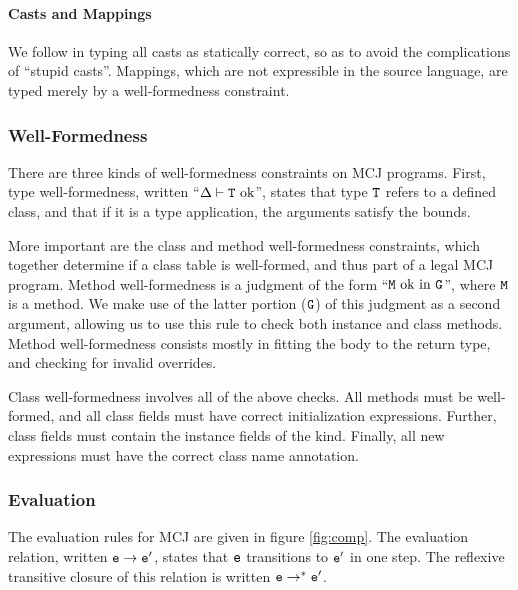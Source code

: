 \documentclass{acmconfbig}
\begin{document}
\paragraph{Casts and Mappings}
We follow \cite{MixGen} in typing all casts as statically correct, so as to
avoid the complications of ``stupid casts''.  Mappings, which are not
expressible in the source language, are typed merely by a
well-formedness constraint.

\subsubsection{Well-Formedness}

There are three kinds of well-formedness constraints on MCJ
programs.  First, type well-formedness, written ``${\Delta} \vdash {\mbox {\tt T}} \mbox{\textrm {\ ok}}$'',
states that type $\mbox {\tt T}$ refers to a defined class, and that if it is a type
application, the arguments satisfy the bounds.

More important are the class and method well-formedness constraints,
which together determine if a class table is well-formed, and thus
part of a legal MCJ program.  Method well-formedness is a
judgment of the form ``$\mbox {\tt M} \mbox{\ ok in}\ \mbox {\tt G}$'', where $\mbox {\tt M}$ is a method.  We make
use of the latter portion ($\mbox {\tt G}$) of this judgment as a second argument,
allowing us to use this rule to check both instance and class methods.
Method well-formedness consists mostly in fitting the body to the
return type, and checking for invalid overrides.

Class well-formedness involves all of the above checks.
All methods must be well-formed, and all class fields must
have correct initialization expressions.  Further, class fields
must contain the instance fields of the kind.  Finally, all
{\txt new} expressions must have the correct class name annotation.


\figExprty

\figWF

\subsubsection{Evaluation}

The evaluation rules for MCJ are given in figure \ref{fig:comp}.
The evaluation relation, written ${\mbox {\tt e}} \rightarrow \mbox {\tt e$'$}$, states that $\mbox {\tt e}$
transitions to $\mbox {\tt e$'$}$ in one step.  The reflexive transitive closure of
this relation is written $\mbox {\tt e} \rightarrow^* \mbox {\tt e$'$}$.

%
\end{document}

